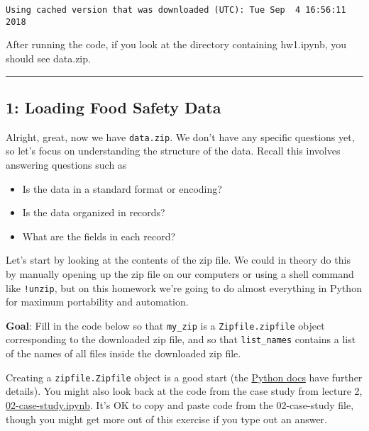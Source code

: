 \documentclass[11pt]{article}
\providecommand{\tightlist}{%
      \setlength{\itemsep}{0pt}\setlength{\parskip}{0pt}}
\begin{document}
    \begin{Verbatim}[commandchars=\\\{\}]
Using cached version that was downloaded (UTC): Tue Sep  4 16:56:11 2018

    \end{Verbatim}

    After running the code, if you look at the directory containing
hw1.ipynb, you should see data.zip.

    \begin{center}\rule{0.5\linewidth}{\linethickness}\end{center}

\subsection{1: Loading Food Safety Data}\label{loading-food-safety-data}

Alright, great, now we have \texttt{data.zip}. We don't have any
specific questions yet, so let's focus on understanding the structure of
the data. Recall this involves answering questions such as

\begin{itemize}
\tightlist
\item
  Is the data in a standard format or encoding?
\item
  Is the data organized in records?
\item
  What are the fields in each record?
\end{itemize}

Let's start by looking at the contents of the zip file. We could in
theory do this by manually opening up the zip file on our computers or
using a shell command like \texttt{!unzip}, but on this homework we're
going to do almost everything in Python for maximum portability and
automation.

\textbf{Goal}: Fill in the code below so that \texttt{my\_zip} is a
\texttt{Zipfile.zipfile} object corresponding to the downloaded zip
file, and so that \texttt{list\_names} contains a list of the names of
all files inside the downloaded zip file.

Creating a \texttt{zipfile.Zipfile} object is a good start (the
\href{https://docs.python.org/3/library/zipfile.html}{Python docs} have
further details). You might also look back at the code from the case
study from lecture 2,
\href{http://www.ds100.org/fa18/assets/lectures/lec02/02-case-study.nbconvert.html}{02-case-study.ipynb}.
It's OK to copy and paste code from the 02-case-study file, though you
might get more out of this exercise if you type out an answer.
\end{document}

